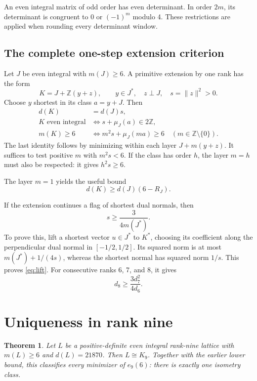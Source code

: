 \documentclass[11pt,a4paper]{article}
\newtheorem{theorem}{Theorem}[section]
\theoremstyle{remark}\newtheorem{remark}[theorem]{Remark}
\newcommand{\Z}{\mathbb Z}\newcommand{\R}{\mathbb R}\newcommand{\F}{\mathbb F}
\begin{document}
An even integral matrix of odd order has even determinant. In order $2m$, its determinant is congruent to $0$ or $(-1)^m$ modulo 4. These restrictions are applied when rounding every determinant window.

\subsection{The complete one-step extension criterion}

Let $J$ be even integral with $m(J)\ge6$. A primitive extension by one rank has the form
\[
K=J+\Z(y+z),\qquad y\in J^*,\quad z\perp J,\quad s=\|z\|^2>0.
\]
Choose $y$ shortest in its class $a=y+J$. Then
\begin{align}
d(K)&=d(J)s,\label{eq:extensiondet}\\
K\text{ even integral}&\Longleftrightarrow s+\mu_J(a)\in2\Z,\label{eq:extensioneven}\\
m(K)\ge6&\Longleftrightarrow
m^2s+\mu_J(ma)\ge6\quad(m\in\Z\setminus\{0\}).\label{eq:extensionmin}
\end{align}
The last identity follows by minimizing within each layer $J+m(y+z)$. It suffices to test positive $m$ with $m^2s<6$. If the class has order $h$, the layer $m=h$ must also be respected: it gives $h^2s\ge6$.

The layer $m=1$ yields the useful bound
\begin{equation}\label{eq:gluebound}
d(K)\ge d(J)(6-R_J).
\end{equation}

If the extension continues a flag of shortest dual normals, then
\begin{equation}\label{eq:lift}
s\ge\frac{3}{4m(J^*)}.
\end{equation}
To prove this, lift a shortest vector $u\in J^*$ to $K^*$, choosing its coefficient along the perpendicular dual normal in $[-1/2,1/2]$. Its squared norm is at most $m(J^*)+1/(4s)$, whereas the shortest normal has squared norm $1/s$. This proves \eqref{eq:lift}. For consecutive ranks 6, 7, and 8, it gives
\begin{equation}\label{eq:lift678}
d_8\ge\frac{3d_7^2}{4d_6}.
\end{equation}

\section{Uniqueness in rank nine}

\begin{theorem}\label{thm:unique}
Let $L$ be a positive-definite even integral rank-nine lattice with $m(L)\ge6$ and $d(L)=21870$. Then $L\cong K_9$. Together with the earlier lower bound, this classifies every minimizer of $e_9(6)$: there is exactly one isometry class.
\end{theorem}
\end{document}
